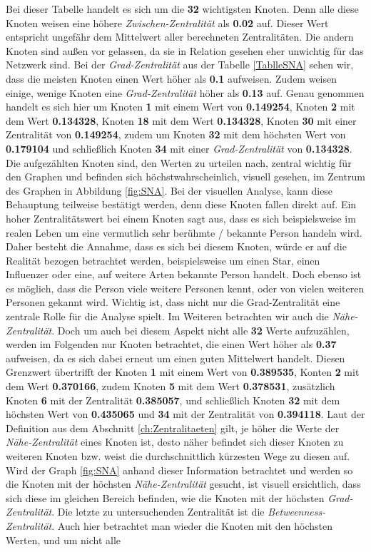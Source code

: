 \FloatBarrier
Bei dieser Tabelle handelt es sich um die \textbf{32} wichtigsten Knoten. Denn alle diese Knoten weisen eine höhere \textit{Zwischen-Zentralität} als \textbf{0.02} auf. Dieser Wert entspricht ungefähr dem Mittelwert aller berechneten Zentralitäten. Die andern Knoten sind außen vor gelassen, da sie in Relation gesehen eher unwichtig für das Netzwerk sind.
Bei der \textit{Grad-Zentralität} aus der Tabelle \ref{TablleSNA} sehen wir, dass die meisten Knoten einen Wert höher als \textbf{0.1} aufweisen. Zudem weisen einige, wenige Knoten eine \textit{Grad-Zentralität} höher als \textbf{0.13} auf. Genau genommen handelt es sich hier um Knoten \textbf{1} mit einem Wert von \textbf{0.149254}, Knoten \textbf{2} mit dem Wert \textbf{0.134328}, Knoten \textbf{18} mit dem Wert \textbf{0.134328}, Knoten \textbf{30} mit einer Zentralität von \textbf{0.149254}, zudem um Knoten \textbf{32} mit dem höchsten Wert von \textbf{0.179104} und schließlich Knoten \textbf{34} mit einer \textit{Grad-Zentralität} von \textbf{0.134328}. Die aufgezählten Knoten sind, den Werten zu urteilen nach, zentral wichtig für den Graphen und befinden sich höchstwahrscheinlich, visuell gesehen, im Zentrum des Graphen in Abbildung \ref{fig:SNA}. Bei der visuellen Analyse, kann diese Behauptung teilweise bestätigt werden, denn diese Knoten fallen direkt auf. Ein hoher Zentralitätswert bei einem Knoten sagt aus, dass es sich beispielsweise im realen Leben um eine vermutlich sehr berühmte / bekannte Person handeln wird. Daher besteht die Annahme, dass es sich bei diesem Knoten, würde er auf die Realität bezogen betrachtet werden, beispielsweise um einen Star, einen Influenzer oder eine, auf weitere Arten bekannte Person handelt. Doch ebenso ist es möglich, dass die Person viele weitere Personen kennt, oder von vielen weiteren Personen gekannt wird. Wichtig ist, dass nicht nur die Grad-Zentralität eine zentrale Rolle für die Analyse spielt. Im Weiteren betrachten wir auch die \textit{Nähe-Zentralität}. Doch um auch bei diesem Aspekt nicht alle \textbf{32} Werte aufzuzählen, werden im Folgenden nur Knoten betrachtet, die einen Wert höher als \textbf{0.37} aufweisen, da es sich dabei erneut um einen guten Mittelwert handelt. Diesen Grenzwert übertrifft der Knoten \textbf{1} mit einem Wert von \textbf{0.389535}, Konten \textbf{2} mit dem Wert \textbf{0.370166}, zudem Knoten \textbf{5} mit dem Wert \textbf{0.378531}, zusätzlich Knoten \textbf{6} mit der Zentralität \textbf{0.385057}, und schließlich Knoten \textbf{32} mit dem höchsten Wert von \textbf{0.435065} und \textbf{34} mit der Zentralität von \textbf{0.394118}. Laut der Definition aus dem Abschnitt \ref{ch:Zentralitaeten} gilt, je höher die Werte der \textit{Nähe-Zentralität} eines Knoten ist, desto näher befindet sich dieser Knoten zu weiteren Knoten bzw. weist die durchschnittlich kürzesten Wege zu diesen auf. Wird der Graph \ref{fig:SNA} anhand dieser Information betrachtet und werden so die Knoten mit der höchsten \textit{Nähe-Zentralität} gesucht, ist visuell ersichtlich, dass sich diese im gleichen Bereich befinden, wie die Knoten mit der höchsten \textit{Grad-Zentralität}. Die letzte zu untersuchenden Zentralität ist die \textit{Betweenness-Zentralität}. Auch hier betrachtet man wieder die Knoten mit den höchsten Werten, und um nicht alle 